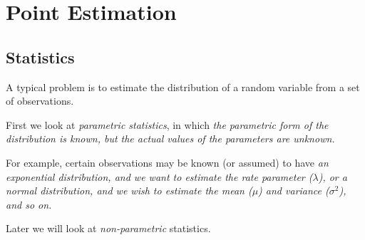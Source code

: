 \chapter{Point Estimation}\label{chap:point-estimation}
\setcounter{page}{1}
\startcontents[chapters]
\chapcontents

\section{Statistics}
\begin{center}
\end{center}

\vspace{2ex}
A typical problem is to estimate the distribution of a random variable from a set of observations. 

\vspace{2ex}
First we look at \emph{parametric statistics}, in which
\bit
\it the parametric form of the distribution is known, but 
\it the actual values of the parameters are unknown.
\eit

\vspace{2ex}
For example, certain observations may be known (or assumed) to have 
\bit 
\it an exponential distribution, and we want to estimate the rate parameter ($\lambda$), or
\it a normal distribution, and we wish to estimate the mean ($\mu$) and variance ($\sigma^2$),
\it and so on.
\eit

\vspace{2ex}
Later we will look at \emph{non-parametric} statistics.%



